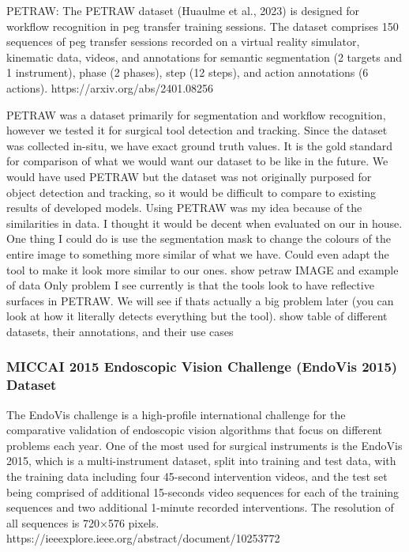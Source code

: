 PETRAW: The PETRAW dataset (Huaulme et al., 2023) is designed for workflow recognition in peg transfer training sessions. The dataset comprises 150 sequences of peg transfer sessions recorded on a virtual reality simulator, kinematic data, videos, and annotations for semantic segmentation (2 targets and 1 instrument), phase (2 phases), step (12 steps), and action annotations (6 actions). https://arxiv.org/abs/2401.08256

PETRAW was a dataset primarily for segmentation and workflow recognition, however we tested it for surgical tool detection and tracking. Since the dataset was collected in-situ, we have exact ground truth values. It is the gold standard for comparison of what we would want our dataset to be like in the future.
We would have used PETRAW but the dataset was not originally purposed for object detection and tracking, so it would be difficult to compare to existing results of developed models.
Using PETRAW was my idea because of the similarities in data. I thought it would be decent when evaluated on our in house. One thing I could do is use the segmentation mask to change the colours of the entire image to something more similar of what we have. Could even adapt the tool to make it look more similar to our ones.
show petraw IMAGE and example of data
Only problem I see currently is that the tools look to have reflective surfaces in PETRAW. We will see if thats actually a big problem later (you can look at how it literally detects everything but the tool).
show table of different datasets, their annotations, and their use cases

\subsubsection{MICCAI 2015 Endoscopic Vision Challenge (EndoVis 2015) Dataset}

The EndoVis challenge is a high-profile international challenge for the comparative validation of endoscopic vision algorithms that focus on different problems each year. One of the most used for surgical instruments is the EndoVis 2015, which is a multi-instrument dataset, split into training and test data, with the training data including four 45-second intervention videos, and the test set being comprised of additional 15-seconds video sequences for each of the training sequences and two additional 1-minute recorded interventions. The resolution of all sequences is 720×576 pixels. https://ieeexplore.ieee.org/abstract/document/10253772

